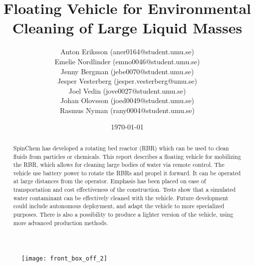 \documentclass[11pt]{article}
\title{Floating Vehicle for Environmental \\ Cleaning of Large Liquid Masses}
\author{Anton Eriksson (aner0164@student.umu.se) \\
  Emelie Nordlinder (emno0046@student.umu.se) \\
  Jenny Bergman (jebe0070@student.umu.se) \\
  Jesper Vesterberg (jesper.vesterberg@umu.se) \\
  Joel Vedin (jove0027@student.umu.se) \\
  Johan Olovsson (joed0049@student.umu.se) \\
Rasmus Nyman (rany0004@student.umu.se)}
\date{\today}
\begin{document}
\begin{titlepage}
  \maketitle
  \thispagestyle{fancy}
  \rhead{\today}

\begin{figure}[H]
   \centering
   \texttt{[image: front\_box\_off\_2]}
   \label{fig:controller_front}
\end{figure}

  \begin{abstract}
    \noindent
    SpinChem\textsuperscript{\textregistered} has developed a rotating bed reactor (RBR) which can be used to
    clean fluids from particles or chemicals. This report describes a floating
    vehicle for mobilizing the RBR, which allows for cleaning large bodies of
    water via remote control. The vehicle use battery power to rotate the RBRs and propel it forward. It can be operated at large distances from the
    operator. Emphasis has been placed on ease of transportation and cost
    effectiveness of the construction. Tests show that a simulated water
    contaminant can be effectively cleaned with the vehicle. Future development
    could include autonomous deployment, and adapt the vehicle to more specialized purposes. There is also a possibility
    to produce a lighter version of the vehicle, using more advanced
    production methods.
  \end{abstract}

\end{titlepage}

\lhead{\thetitle}
\rhead{\today}
\cfoot{\thepage}


\clearpage
\tableofcontents
\clearpage
\end{document}
